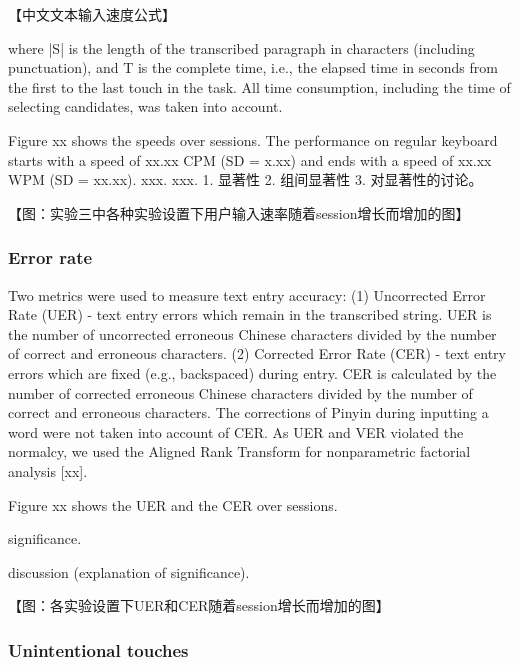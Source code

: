 【中文文本输入速度公式】

where |S| is the length of the transcribed paragraph in characters (including punctuation), and T is the complete time, i.e., the elapsed time in seconds from the first to the last touch
in the task. All time consumption, including the time of selecting candidates, was taken into account.


Figure xx shows the speeds over sessions. The performance on regular keyboard starts with a speed of xx.xx CPM (SD = x.xx) and ends with a speed of xx.xx WPM (SD = xx.xx). xxx. xxx. 1. 显著性 2. 组间显著性 3. 对显著性的讨论。

【图：实验三中各种实验设置下用户输入速率随着session增长而增加的图】

\subsubsection{Error rate}

Two metrics were used to measure text entry accuracy: (1) Uncorrected Error Rate (UER) - text entry errors which remain in the transcribed string. UER is the number of uncorrected erroneous Chinese characters divided by the number of correct and erroneous characters. (2) Corrected Error Rate (CER) - text entry errors which are fixed (e.g., backspaced) during entry. CER is calculated by the number of corrected erroneous Chinese characters divided by the number of correct and erroneous characters. The corrections of Pinyin during inputting a word were not taken into account of CER. As UER and VER violated the normalcy, we used the Aligned Rank Transform for nonparametric factorial analysis [xx].

Figure xx shows the UER and the CER over sessions.

significance.

discussion (explanation of significance).

【图：各实验设置下UER和CER随着session增长而增加的图】

\subsubsection{Unintentional touches}

